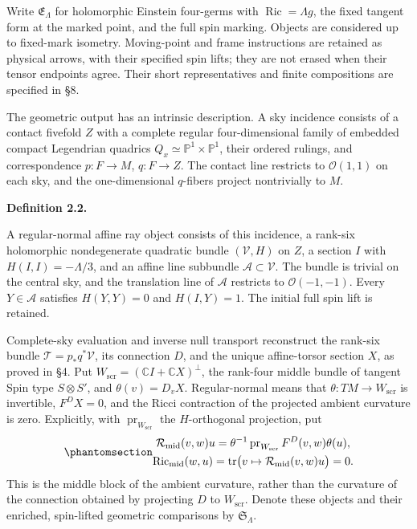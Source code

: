 \documentclass[
  english,
  11pt,
  reqno]{amsart}
\makeatletter
\newcommand{\pandocstatementheading}[1]{%
  \par\addpenalty{\@beginparpenalty}%
  \addvspace{.5\baselineskip plus .2\baselineskip minus .2\baselineskip}%
  {\normalfont\bfseries #1\par}%
  \nobreak\@afterindenttrue\@afterheading
}
\makeatother
\begin{document}
Write \(\mathfrak E_\Lambda\) for holomorphic Einstein four-germs with
\(\operatorname{Ric}=\Lambda g\), the fixed tangent form at the marked
point, and the full spin marking. Objects are considered up to
fixed-mark isometry. Moving-point and frame instructions are retained as
physical arrows, with their specified spin lifts; they are not erased
when their tensor endpoints agree. Their short representatives and
finite compositions are specified in §8.

The geometric output has an intrinsic description. A sky incidence
consists of a contact fivefold \(Z\) with a complete regular
four-dimensional family of embedded compact Legendrian quadrics
\(Q_x\simeq\mathbb P^1\times\mathbb P^1\), their ordered rulings, and
correspondence \(p:F\to M\), \(q:F\to Z\). The contact line restricts to
\(\mathcal O(1,1)\) on each sky, and the one-dimensional \(q\)-fibers
project nontrivially to \(M\).

\pandocstatementheading{\protect{}\label{def:gg-ray-object}Definition 2.2.}

A regular-normal affine ray object consists of this incidence, a
rank-six holomorphic nondegenerate quadratic bundle \((\mathcal V,H)\)
on \(Z\), a section \(I\) with \(H(I,I)=-\Lambda/3\), and an affine line
subbundle \(\mathscr A\subset\mathcal V\). The bundle is trivial on the
central sky, and the translation line of \(\mathscr A\) restricts to
\(\mathcal O(-1,-1)\). Every \(Y\in\mathscr A\) satisfies \(H(Y,Y)=0\)
and \(H(I,Y)=1\). The initial full spin lift is retained.

Complete-sky evaluation and inverse null transport reconstruct the
rank-six bundle \(\mathcal T=p_*q^*\mathcal V\), its connection \(D\),
and the unique affine-torsor section \(X\), as proved in §4. Put
\(W_{\mathrm{scr}}=(\mathbb CI+\mathbb CX)^\perp\), the rank-four middle
bundle of tangent Spin type \(S\otimes S'\), and \(\theta(v)=D_vX\).
Regular-normal means that \(\theta:TM\to W_{\mathrm{scr}}\) is
invertible, \(F^DX=0\), and the Ricci contraction of the projected
ambient curvature is zero. Explicitly, with
\(\operatorname{pr}_{W_{\mathrm{scr}}}\) the \(H\)-orthogonal
projection, put
\begin{equation}\protect\phantomsection\label{eq:gg-ray-middle-curvature-definition}{\begin{gathered}
\mathcal R_{\mathrm{mid}}(v,w)u
  =\theta^{-1}\operatorname{pr}_{W_{\mathrm{scr}}}
                   F^D(v,w)\theta(u), \\
\operatorname{Ric}_{\mathrm{mid}}(w,u)
  =\operatorname{tr}\bigl(v\mapsto\mathcal R_{\mathrm{mid}}(v,w)u\bigr)=0.
\end{gathered}}\end{equation} This is the middle block of the ambient curvature,
rather than the curvature of the connection obtained by projecting \(D\)
to \(W_{\mathrm{scr}}\). Denote these objects and their enriched,
spin-lifted geometric comparisons by \(\mathfrak S_\Lambda\).
\end{document}
